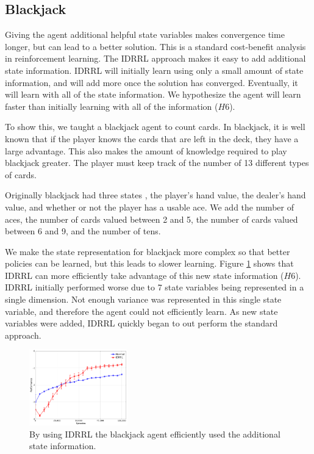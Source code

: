 \documentclass[10pt,a4paper]{article}
\begin{document}
\subsection{Blackjack}
Giving the agent additional helpful state variables makes convergence time longer, but can lead to a better solution. This is a standard cost-benefit analysis in reinforcement learning. The IDRRL approach makes it easy to add additional state information. IDRRL will initially learn using only a small amount of state information, and will add more once the solution has converged. Eventually, it will learn with all of the state information. We hypothesize the agent will learn faster than initially learning with all of the information ($H6$).

To show this, we taught a blackjack agent to count cards. In blackjack, it is well known that if the player knows the cards that are left in the deck, they have a large advantage. This also makes the amount of knowledge required to play blackjack greater. The player must keep track of the number of 13 different types of cards.

Originally blackjack had three states \cite{NIPSbench:05}, the player's hand value, the dealer's hand value, and whether or not the player has a usable ace. We add the number of aces, the number of cards valued between 2 and 5, the number of cards valued between 6 and 9, and the number of tens. 

We make the state representation for blackjack more complex so that better policies can be learned, but this leads to slower learning. Figure \ref{fig:Blackjack_IDRRL} shows that IDRRL can more efficiently take advantage of this new state information ($H6$). IDRRL initially performed worse due to 7 state variables being represented in a single dimension. Not enough variance was represented in this single state variable, and therefore the agent could not efficiently learn. As new state variables were added, IDRRL quickly began to out perform the standard approach.

\begin{figure}[h!]
  \centering
      \includegraphics[width=0.38\textwidth]{Blackjack_IDRRL}
  \caption{By using IDRRL the blackjack agent efficiently used the additional state information.}
  \label{fig:Blackjack_IDRRL}
\end{figure}
\end{document}

